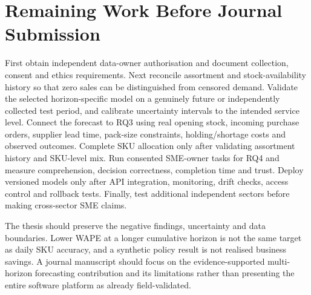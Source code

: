 \section{Remaining Work Before Journal Submission}

First obtain independent data-owner authorisation and document collection, consent and ethics requirements. Next reconcile assortment and stock-availability history so that zero sales can be distinguished from censored demand. Validate the selected horizon-specific model on a genuinely future or independently collected test period, and calibrate uncertainty intervals to the intended service level. Connect the forecast to RQ3 using real opening stock, incoming purchase orders, supplier lead time, pack-size constraints, holding/shortage costs and observed outcomes. Complete SKU allocation only after validating assortment history and SKU-level mix. Run consented SME-owner tasks for RQ4 and measure comprehension, decision correctness, completion time and trust. Deploy versioned models only after API integration, monitoring, drift checks, access control and rollback tests. Finally, test additional independent sectors before making cross-sector SME claims.

The thesis should preserve the negative findings, uncertainty and data boundaries. Lower WAPE at a longer cumulative horizon is not the same target as daily SKU accuracy, and a synthetic policy result is not realised business savings. A journal manuscript should focus on the evidence-supported multi-horizon forecasting contribution and its limitations rather than presenting the entire software platform as already field-validated.
